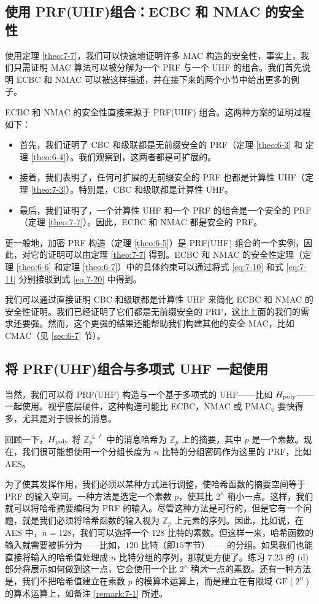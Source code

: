 \subsection{使用 PRF(UHF)组合：ECBC 和 NMAC 的安全性}\label{subsec:7-3-1}

使用定理 \ref{theo:7-7}，我们可以快速地证明许多 MAC 构造的安全性，事实上，我们只需证明 MAC 算法可以被分解为一个 PRF 与一个 UHF 的组合。我们首先说明 ECBC 和 NMAC 可以被这样描述，并在接下来的两个小节中给出更多的例子。

ECBC 和 NMAC 的安全性直接来源于 PRF(UHF) 组合。这两种方案的证明过程如下：
\begin{itemize}
	\item 首先，我们证明了 CBC 和级联都是无前缀安全的 PRF（定理 \ref{theo:6-3} 和 定理 \ref{theo:6-4}）。我们观察到，这两者都是可扩展的。
	\item 接着，我们表明了，任何可扩展的无前缀安全的 PRF 也都是计算性 UHF（定理 \ref{theo:7-3}）。特别是，CBC 和级联都是计算性 UHF。
	\item 最后，我们证明了，一个计算性 UHF 和一个 PRF 的组合是一个安全的 PRF（定理 \ref{theo:7-7}）。因此，ECBC 和 NMAC 都是安全的 PRF。
\end{itemize}
更一般地，加密 PRF 构造（定理 \ref{theo:6-5}）是 PRF(UHF) 组合的一个实例，因此，对它的证明可以由定理 \ref{theo:7-7} 得到。ECBC 和 NMAC 的安全性定理（定理 \ref{theo:6-6} 和定理 \ref{theo:6-7}）中的具体约束可以通过将式 \ref{eq:7-10} 和式 \ref{eq:7-11} 分别接驳到式 \ref{eq:7-20} 中得到。

我们可以通过直接证明 CBC 和级联都是计算性 UHF 来简化 ECBC 和 NMAC 的安全性证明。我们已经证明了它们都是无前缀安全的 PRF，这比上面的我们的需求还要强。然而，这个更强的结果还能帮助我们构建其他的安全 MAC，比如 CMAC（见 \ref{sec:6-7} 节）。

\subsection{将 PRF(UHF)组合与多项式 UHF 一起使用}\label{subsec:7-3-2}

当然，我们可以将 PRF(UHF) 构造与一个基于多项式的 UHF——比如 $H_{\rm poly}$——一起使用。视乎底层硬件，这种构造可能比 ECBC，NMAC 或 $\mathrm{PMAC}_0$ 要快得多，尤其是对于很长的消息。

回顾一下，$H_{\rm poly}$ 将 $\mathbb{Z}^{\leq\ell}_p$ 中的消息哈希为 $\mathbb{Z}_p$ 上的摘要，其中 $p$ 是一个素数。现在，我们很可能想使用一个分组长度为 $n$ 比特的分组密码作为这里的 PRF，比如 AES。

为了使其发挥作用，我们必须以某种方式进行调整，使哈希函数的摘要空间等于 PRF 的输入空间。一种方法是选定一个素数 $p$，使其比 $2^n$ 稍小一点。这样，我们就可以将哈希摘要编码为 PRF 的输入。尽管这种方法是可行的，但是它有一个问题，就是我们必须将哈希函数的输入视为 $\mathbb{Z}_p$ 上元素的序列。因此，比如说，在 AES 中，$n=128$，我们可以选择一个 $128$ 比特的素数。但这样一来，哈希函数的输入就需要被拆分为——比如，$120$ 比特（即$15$字节）——的分组。如果我们也能直接将输入的哈希值处理成 $n$ 比特分组的序列，那就更方便了。练习 7.23 的 (d) 部分将展示如何做到这一点，它会使用一个比 $2^n$ 稍\emph{大}一点的素数。还有一种方法是，我们不把哈希值建立在素数 $p$ 的模算术运算上，而是建立在有限域 $\mathrm{GF}(2^n)$ 的算术运算上，如备注 \ref{remark:7-1} 所述。


